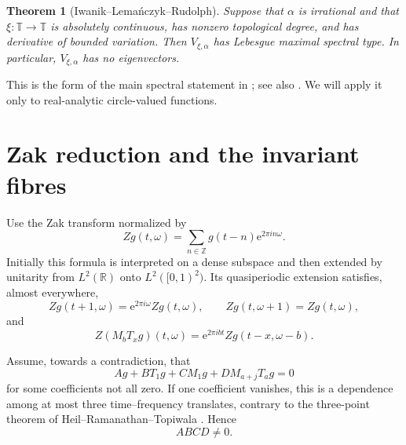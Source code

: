 \documentclass[11pt]{amsart}
\newtheorem{theorem}{Theorem}
\theoremstyle{remark}
\newcommand{\R}{\mathbb R}
\newcommand{\Z}{\mathbb Z}
\newcommand{\T}{\mathbb T}
\newcommand{\e}{\mathrm e}
\begin{document}
\begin{theorem}[Iwanik--Lema\'nczyk--Rudolph]\label{thm:ILR}
Suppose that $\alpha$ is irrational and that $\xi:\T\to\T$ is absolutely continuous,
has nonzero topological degree, and has derivative of bounded variation. Then
$V_{\xi,\alpha}$ has Lebesgue maximal spectral type. In particular,
$V_{\xi,\alpha}$ has no eigenvectors.
\end{theorem}

This is the form of the main spectral statement in \cite{ILR}; see also
\cite[Theorem~4]{KanigowskiLemanczyk}. We will apply it only to real-analytic
circle-valued functions.

\section{Zak reduction and the invariant fibres}

Use the Zak transform normalized by
\[
 Zg(t,\omega)=\sum_{n\in\Z}g(t-n)\e^{2\pi i n\omega}.
\]
Initially this formula is interpreted on a dense subspace and then extended by unitarity
from $L^2(\R)$ onto $L^2([0,1)^2)$. Its quasiperiodic extension satisfies, almost
everywhere,
\begin{equation}\label{eq:zak-quasi}
 Zg(t+1,\omega)=\e^{2\pi i\omega}Zg(t,\omega),
 \qquad
 Zg(t,\omega+1)=Zg(t,\omega),
\end{equation}
and
\begin{equation}\label{eq:zak-covariance}
 Z(M_bT_xg)(t,\omega)=\e^{2\pi i bt}Zg(t-x,\omega-b).
\end{equation}

Assume, towards a contradiction, that
\begin{equation}\label{eq:dependence}
 A g+B T_1g+C M_1g+D M_{a+j}T_ag=0
\end{equation}
for some coefficients not all zero. If one coefficient vanishes, this is a dependence
among at most three time--frequency translates, contrary to the three-point theorem of
Heil--Ramanathan--Topiwala \cite{HRT}. Hence
\begin{equation}\label{eq:nonzero-coefficients}
 A B C D\ne0.
\end{equation}
\end{document}
